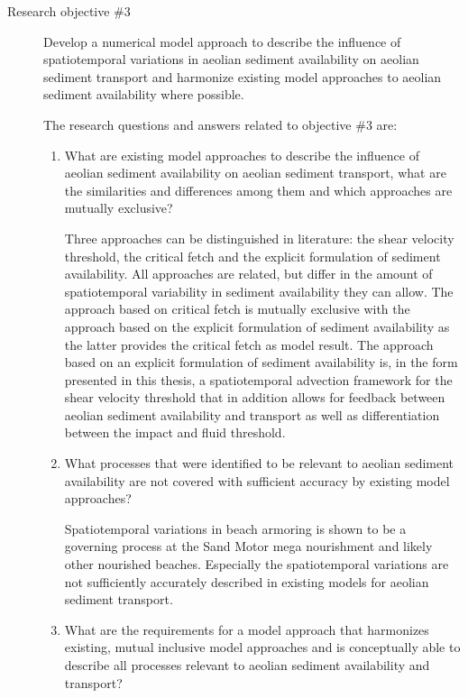 \begin{description}
\begin{enumerate}[{2.}1]
\end{enumerate}

\bigskip

\item[Research objective \#3] Develop a numerical model approach to
  describe the influence of spatiotemporal variations in aeolian
  sediment availability on aeolian sediment transport and harmonize
  existing model approaches to aeolian sediment availability where
  possible.

  \medskip

  The research questions and answers related to objective \#3 are:

  \begin{enumerate}[{3.}1]
  \item What are existing model approaches to describe the influence
    of aeolian sediment availability on aeolian sediment transport,
    what are the similarities and differences among them and which
    approaches are mutually exclusive?

    Three approaches can be distinguished in literature: the shear
    velocity threshold, the critical fetch and the explicit
    formulation of sediment availability. All approaches are
    related, but differ in the amount of spatiotemporal variability in
    sediment availability they can allow. The approach based on
    critical fetch is mutually exclusive with the approach based on
    the explicit formulation of sediment availability as the latter
    provides the critical fetch as model result. The approach based on
    an explicit formulation of sediment availability is, in the form
    presented in this thesis, a spatiotemporal advection framework for
    the shear velocity threshold that in addition allows for feedback
    between aeolian sediment availability and transport as well as
    differentiation between the impact and fluid threshold.
  
  \item What processes that were identified to be relevant to aeolian
    sediment availability are not covered with sufficient accuracy by
    existing model approaches?

    Spatiotemporal variations in beach armoring is shown to be a
    governing process at the Sand Motor mega nourishment and likely
    other nourished beaches. Especially the spatiotemporal variations
    are not sufficiently accurately described in existing models for
    aeolian sediment transport.

  \item What are the requirements for a model approach that harmonizes
    existing, mutual inclusive model approaches and is conceptually
    able to describe all processes relevant to aeolian sediment
    availability and transport?


\end{enumerate}
\end{description}
